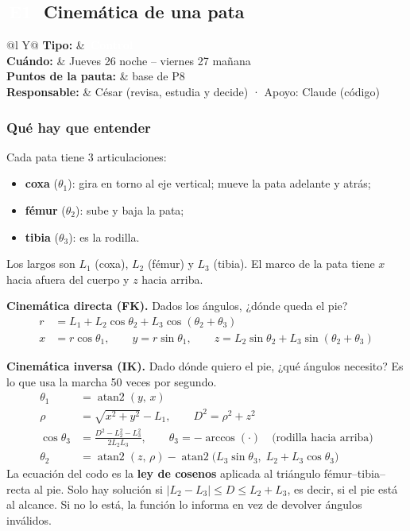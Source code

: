 \documentclass[11pt,a4paper]{article}
\makeatletter
\newcommand{\pill}[2]{{\setlength{\fboxsep}{1.6pt}\colorbox{#1}{\textcolor{white}{\footnotesize\bfseries\,#2\,}}}}
\newcommand{\Eu}{\pill{cControl}{E1}}
\newcommand{\ficha}[4]{%
  \begin{tabularx}{\linewidth}{@{}l Y@{}}
  \textbf{Tipo:} & \pill{#1}{#2}\\
  \textbf{Cuándo:} & #3\\
  \textbf{Puntos de la pauta:} & #4\\
  \textbf{Responsable:} & César (revisa, estudia y decide) · Apoyo: Claude (código)\\
  \end{tabularx}\par}
\makeatother
\begin{document}
\subsection{\texorpdfstring{\Eu\ }{E1 }Cinemática de una pata}
\ficha{cControl}{Control}{Jueves 26 noche -- viernes 27 mañana}{base de P8}

\subsubsection{Qué hay que entender}
Cada pata tiene 3 articulaciones:
\begin{itemize}
  \item \textbf{coxa} ($\theta_1$): gira en torno al eje vertical; mueve la pata adelante y atrás;
  \item \textbf{fémur} ($\theta_2$): sube y baja la pata;
  \item \textbf{tibia} ($\theta_3$): es la rodilla.
\end{itemize}
Los largos son $L_1$ (coxa), $L_2$ (fémur) y $L_3$ (tibia). El marco de la pata tiene $x$ hacia afuera del cuerpo y $z$ hacia arriba.

\textbf{Cinemática directa (FK).} Dados los ángulos, ¿dónde queda el pie?
\begin{align}
r &= L_1 + L_2\cos\theta_2 + L_3\cos(\theta_2+\theta_3)\\
x &= r\cos\theta_1,\qquad y = r\sin\theta_1,\qquad z = L_2\sin\theta_2 + L_3\sin(\theta_2+\theta_3)
\end{align}

\textbf{Cinemática inversa (IK).} Dado dónde quiero el pie, ¿qué ángulos necesito? Es lo que usa la marcha 50 veces por segundo.
\begin{align}
\theta_1 &= \operatorname{atan2}(y,\,x)\\
\rho &= \sqrt{x^2+y^2} - L_1,\qquad D^2 = \rho^2 + z^2\\
\cos\theta_3 &= \frac{D^2 - L_2^2 - L_3^2}{2L_2L_3},\qquad \theta_3 = -\arccos(\cdot)\quad\text{(rodilla hacia arriba)}\\
\theta_2 &= \operatorname{atan2}(z,\,\rho) - \operatorname{atan2}\!\big(L_3\sin\theta_3,\; L_2 + L_3\cos\theta_3\big)
\end{align}
La ecuación del codo es la \textbf{ley de cosenos} aplicada al triángulo fémur--tibia--recta al pie. Solo hay solución si $|L_2-L_3| \leq D \leq L_2+L_3$, es decir, si el pie está al alcance. Si no lo está, la función lo informa en vez de devolver ángulos inválidos.
\end{document}
